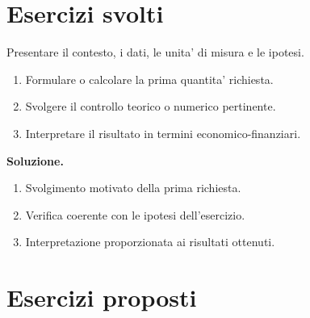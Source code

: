 

\section{Esercizi svolti}
\label{sec:capNN-esercizi-svolti}

\begin{exercise}
\label{ex:capNN-identificativo-svolto}
Presentare il contesto, i dati, le unita' di misura e le ipotesi.

\begin{enumerate}
\item Formulare o calcolare la prima quantita' richiesta.
\item Svolgere il controllo teorico o numerico pertinente.
\item Interpretare il risultato in termini economico-finanziari.
\end{enumerate}
\end{exercise}

\noindent
\textbf{Soluzione.}
\begin{enumerate}
\item Svolgimento motivato della prima richiesta.
\item Verifica coerente con le ipotesi dell'esercizio.
\item Interpretazione proporzionata ai risultati ottenuti.
\end{enumerate}



\section{Esercizi proposti}
\label{sec:capNN-esercizi-proposti}

